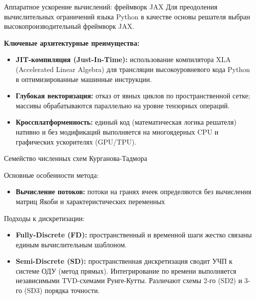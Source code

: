 \documentclass[ignoreonframetext,unicode,aspectratio=169]{beamer}
\begin{document}
	
	
	\appendix
	
	\begin{frame}{Аппаратное ускорение вычислений: фреймворк JAX}
		Для преодоления вычислительных ограничений языка Python в качестве основы решателя выбран высокопроизводительный фреймворк JAX.
		
		\vspace{0.3cm}
		\textbf{Ключевые архитектурные преимущества:}
		\begin{itemize}
				\item \textbf{JIT-компиляция (Just-In-Time):} использование компилятора XLA (Accelerated Linear Algebra) для трансляции высокоуровневого кода Python в оптимизированные машинные инструкции.
				\item \textbf{Глубокая векторизация:} отказ от явных циклов по пространственной сетке; массивы обрабатываются параллельно на уровне тензорных операций.
				\item \textbf{Кроссплатформенность:} единый код (математическая логика решателя) нативно и без модификаций выполняется на многоядерных CPU и графических ускорителях (GPU/TPU).
			\end{itemize}
	\end{frame}
	
	\begin{frame}{Семейство численных схем Курганова-Тадмора}
		
		\begin{block}{Основные особенности метода:}
			\begin{itemize}
				\item \textbf{Вычисление потоков:} потоки на гранях ячеек определяются без вычисления матриц Якоби и характеристических переменных 
			\end{itemize}
		\end{block}
		
		\begin{block}{Подходы к дискретизации:}
			\begin{itemize}
				\item \textbf{Fully-Discrete (FD):} пространственный и временной шаги жестко связаны единым вычислительным шаблоном.
				\item \textbf{Semi-Discrete (SD):} пространственная дискретизация сводит УЧП к системе ОДУ (метод прямых). Интегрирование по времени выполняется независимыми TVD-схемами Рунге-Кутты. Различают схемы 2-го (SD2) и 3-го (SD3) порядка точности.
			\end{itemize}
		\end{block}
		
	\end{frame}
	
\end{document}
